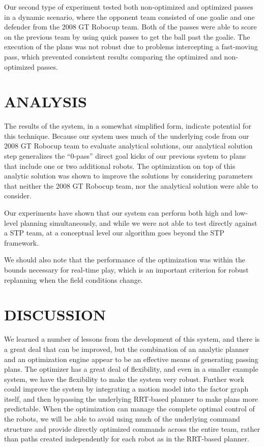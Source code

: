 \documentclass[a4paper, 10pt, conference]{ieeeconf}      %
\begin{document}
Our second type of experiment tested both non-optimized and optimized passes in a dynamic scenario, where the opponent team consisted of one goalie and one defender from the 2008 GT Robocup team. Both of the passes were able to score on the previous team by using quick passes to get the ball past the goalie. The execution of the plans was not robust due to problems intercepting a fast-moving pass, which prevented consistent results comparing the optimized and non-optimized passes.

\section{ANALYSIS}
The results of the system, in a somewhat simplified form, indicate potential for this technique. Because our system uses much of the underlying code from our 2008 GT Robocup team to evaluate analytical solutions, our analytical solution step generalizes the ``0-pass'' direct goal kicks of our previous system to plans that include one or two additional robots. The optimization on top of this analytic solution was shown to improve the solutions by considering parameters that neither the 2008 GT Robocup team, nor the analytical solution were able to consider.

Our experiments have shown that our system can perform both high and low-level planning simultaneously, and while we were not able to test directly against a STP team, at a conceptual level our algorithm goes beyond the STP framework.

We should also note that the performance of the optimization was within the bounds necessary for real-time play, which is an important criterion for robust replanning when the field conditions change.  

\section{DISCUSSION}
We learned a number of lessons from the development of this system, and there is a great deal that can be improved, but the combination of an analytic planner and an optimization engine appear to be an effective means of generating passing plans.  The optimizer has a great deal of flexibility, and even in a smaller example system, we have the flexibility to make the system very robust.  Further work could improve the system by integrating a motion model into the factor graph itself, and then bypassing the underlying RRT-based planner to make plans more predictable. When the optimization can manage the complete optimal control of the robots, we will be able to avoid using much of the underlying command structure and provide directly optimized commands across the entire team, rather than paths created independently for each robot as in the RRT-based planner.  
\end{document}
